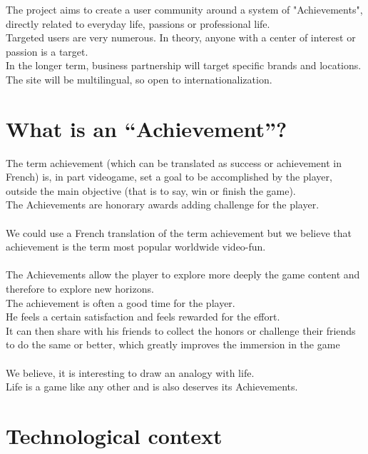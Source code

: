 \documentclass{life-fr}
\begin{document}
The project aims to create a user community around a system of "Achievements", directly related to everyday life, passions or professional life.\\

Targeted users are very numerous. In theory, anyone with a center of interest or passion is a target.\\

In the longer term, business partnership will target specific brands and locations.\\

The site will be multilingual, so open to internationalization.

\section{What is an ``Achievement''?}

The term achievement (which can be translated as success or achievement in French) is, in part videogame, set a goal to be accomplished by the player, outside the main objective (that is to say, win or finish the game).\\
The Achievements are honorary awards adding challenge for the player.\\
\\
We could use a French translation of the term achievement but we believe that achievement is the term most popular worldwide video-fun.\\
\\
The Achievements allow the player to explore more deeply the game content and therefore to explore new horizons.\\
The achievement is often a good time for the player.\\
He feels a certain satisfaction and feels rewarded for the effort.\\
It can then share with his friends to collect the honors or challenge their friends to do the same or better, which greatly improves the immersion in the game \\
\\
We believe, it is interesting to draw an analogy with life.\\
Life is a game like any other and is also deserves its Achievements.\\

\section{Technological context}
\end{document}
